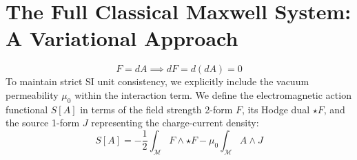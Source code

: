 \documentclass[11pt,a4paper]{article}
\begin{document}
\section{The Full Classical Maxwell System: A Variational Approach}
\begin{equation}
F = dA \implies dF = d(dA) = 0
\end{equation}
To maintain strict SI unit consistency, we explicitly include the vacuum permeability $\mu_0$ within the interaction term. We define the electromagnetic action functional $S[A]$ in terms of the field strength 2-form $F$, its Hodge dual $\star F$, and the source 1-form $J$ representing the charge-current density:
\begin{equation}
S[A] = -\frac{1}{2} \int_{\mathcal{M}} F \wedge \star F - \mu_0 \int_{\mathcal{M}} A \wedge J
\end{equation}
\end{document}
